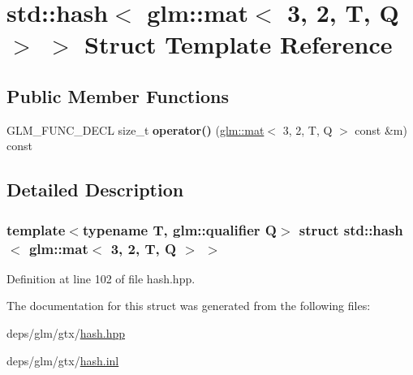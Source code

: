 \hypertarget{structstd_1_1hash_3_01glm_1_1mat_3_013_00_012_00_01T_00_01Q_01_4_01_4}{}\section{std\+:\+:hash$<$ glm\+:\+:mat$<$ 3, 2, T, Q $>$ $>$ Struct Template Reference}
\label{structstd_1_1hash_3_01glm_1_1mat_3_013_00_012_00_01T_00_01Q_01_4_01_4}
\subsection*{Public Member Functions}
\begin{DoxyCompactItemize}
\item 
\mbox{\label{structstd_1_1hash_3_01glm_1_1mat_3_013_00_012_00_01T_00_01Q_01_4_01_4_ac423e14a0eb19682abe1a9ea5c7e24a3}} 
G\+L\+M\+\_\+\+F\+U\+N\+C\+\_\+\+D\+E\+CL size\+\_\+t {\bfseries operator()} (\hyperlink{structglm_1_1mat}{glm\+::mat}$<$ 3, 2, T, Q $>$ const \&m) const
\end{DoxyCompactItemize}


\subsection{Detailed Description}
\subsubsection*{template$<$typename T, glm\+::qualifier Q$>$\newline
struct std\+::hash$<$ glm\+::mat$<$ 3, 2, T, Q $>$ $>$}



Definition at line 102 of file hash.\+hpp.



The documentation for this struct was generated from the following files\+:\begin{DoxyCompactItemize}
\item 
deps/glm/gtx/\hyperlink{hash_8hpp}{hash.\+hpp}\item 
deps/glm/gtx/\hyperlink{hash_8inl}{hash.\+inl}\end{DoxyCompactItemize}
